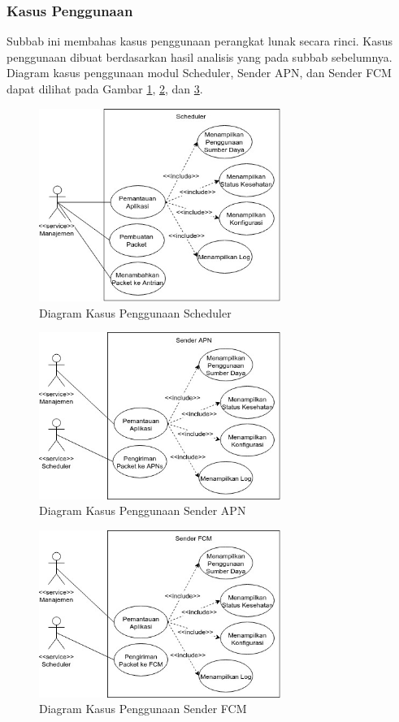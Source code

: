 \subsubsection{Kasus Penggunaan}
\par Subbab ini membahas kasus penggunaan perangkat lunak secara rinci. Kasus penggunaan dibuat berdasarkan hasil analisis yang pada subbab sebelumnya. Diagram kasus penggunaan modul Scheduler, Sender APN, dan Sender FCM dapat dilihat pada Gambar \ref{img:uc-scheduler}, \ref{img:uc-sender_apn}, dan \ref{img:uc-sender_fcm}.
\begin{figure}[H]
    \centering\includegraphics[width=0.7\textwidth]{bab3/img/usecase-scheduler.jpg}
    \caption{Diagram Kasus Penggunaan Scheduler} \label{img:uc-scheduler}
\end{figure}
\begin{figure}[H]
	\centering\includegraphics[width=0.7\textwidth]{bab3/img/usecase-sender_apn.jpg}
	\caption{Diagram Kasus Penggunaan Sender APN} \label{img:uc-sender_apn}
\end{figure}
\begin{figure}[H]
	\centering\includegraphics[width=0.7\textwidth]{bab3/img/usecase-sender_fcm.jpg}
	\caption{Diagram Kasus Penggunaan Sender FCM} \label{img:uc-sender_fcm}
\end{figure}

